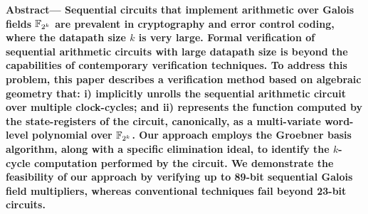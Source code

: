 \documentclass[twocolumn]{article}
\begin{document}
{\small\textbf{Abstract---
Sequential circuits that implement arithmetic over Galois fields
${\mathbb{F}}_{2^k}$ are prevalent in cryptography and error control coding, where
the datapath size $k$ is very large. Formal verification of sequential
arithmetic circuits with large datapath size is beyond the
capabilities of contemporary verification techniques. To address this
problem, this paper describes a verification method based on algebraic
geometry that: i) implicitly unrolls the sequential arithmetic circuit
over multiple clock-cycles; and ii) represents the function
computed by the state-registers of the circuit, canonically, as a
multi-variate word-level polynomial over ${\mathbb{F}}_{2^k}$. Our approach employs
the Groebner basis algorithm, along with a specific elimination ideal,
to identify the $k$-cycle computation performed  by the circuit. We
demonstrate the feasibility of our approach by verifying up to 89-bit
sequential Galois field multipliers, whereas conventional techniques
fail beyond 23-bit circuits. 
}}

 
 
 
 
 


\end{document}
